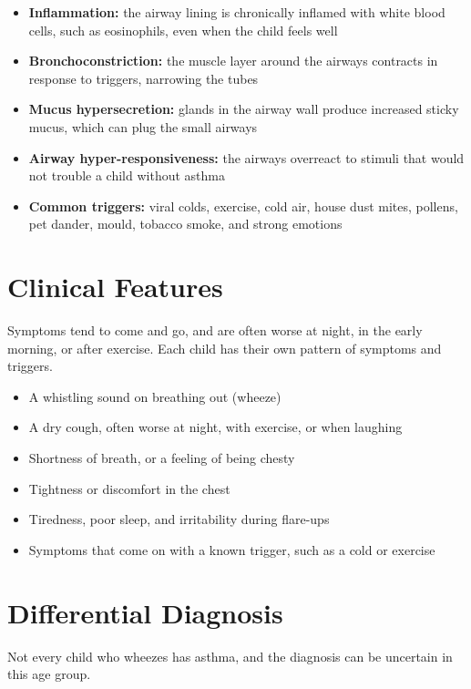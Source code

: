 \begin{itemize}
    \item \textbf{Inflammation:} the airway lining is chronically inflamed with white blood cells, such as eosinophils, even when the child feels well
    \item \textbf{Bronchoconstriction:} the muscle layer around the airways contracts in response to triggers, narrowing the tubes
    \item \textbf{Mucus hypersecretion:} glands in the airway wall produce increased sticky mucus, which can plug the small airways
    \item \textbf{Airway hyper-responsiveness:} the airways overreact to stimuli that would not trouble a child without asthma
    \item \textbf{Common triggers:} viral colds, exercise, cold air, house dust mites, pollens, pet dander, mould, tobacco smoke, and strong emotions
\end{itemize}

\section*{Clinical Features}
Symptoms tend to come and go, and are often worse at night, in the early morning, or after exercise. Each child has their own pattern of symptoms and triggers.

\begin{itemize}
    \item A whistling sound on breathing out (wheeze)
    \item A dry cough, often worse at night, with exercise, or when laughing
    \item Shortness of breath, or a feeling of being chesty
    \item Tightness or discomfort in the chest
    \item Tiredness, poor sleep, and irritability during flare-ups
    \item Symptoms that come on with a known trigger, such as a cold or exercise
\end{itemize}

\section*{Differential Diagnosis}
Not every child who wheezes has asthma, and the diagnosis can be uncertain in this age group.


